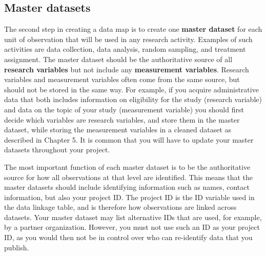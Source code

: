 \subsection{Master datasets}

The second step in creating a data map is to create one \textbf{master dataset}
for each unit of observation that will be used in any research activity.
Examples of such activities are data collection, data analysis,
random sampling, and treatment assignment.
The master dataset should be the authoritative source of
all \textbf{research variables}
but not include any \textbf{measurement variables}.
Research variables and measurement variables
often come from the same source,
but should not be stored in the same way.
For example, if you acquire administrative data that both includes
information on eligibility for the study (research variable)
and data on the topic of your study (measurement variable)
you should first decide which variables are research variables,
and store them in the master dataset,
while storing the measurement variables in a cleaned dataset
as described in Chapter 5.
It is common that you will have to update
your master datasets throughout your project.

The most important function of each master dataset
is to be the authoritative source
for how all observations at that level are identified.
This means that the master datasets should include
identifying information such as names, contact information,
but also your project ID.
The project ID is the ID variable used in the data linkage table,
and is therefore how observations are linked across datasets.
Your master dataset may list alternative IDs that are used,
for example, by a partner organization.
However, you must not use such an ID as your project ID,
as you would then not be in control over
who can re-identify data that you publish.

